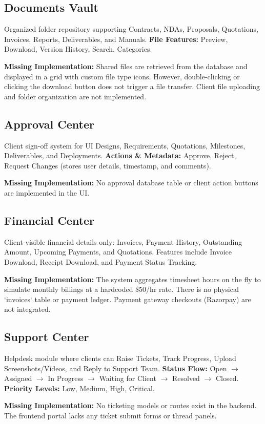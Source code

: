 \documentclass[11pt,a4paper]{article}
\begin{document}
\subsection{Documents Vault}
Organized folder repository supporting Contracts, NDAs, Proposals, Quotations, Invoices, Reports, Deliverables, and Manuals.
\newline
\textbf{File Features:} Preview, Download, Version History, Search, Categories.
\begin{partialstatus}
  \textbf{Missing Implementation:} Shared files are retrieved from the database and displayed in a grid with custom file type icons. However, double-clicking or clicking the download button does not trigger a file transfer. Client file uploading and folder organization are not implemented.
\end{partialstatus}

\subsection{Approval Center}
Client sign-off system for UI Designs, Requirements, Quotations, Milestones, Deliverables, and Deployments.
\newline
\textbf{Actions \& Metadata:} Approve, Reject, Request Changes (stores user details, timestamp, and comments).
\begin{missingstatus}
  \textbf{Missing Implementation:} No approval database table or client action buttons are implemented in the UI.
\end{missingstatus}

\subsection{Financial Center}
Client-visible financial details only: Invoices, Payment History, Outstanding Amount, Upcoming Payments, and Quotations. Features include Invoice Download, Receipt Download, and Payment Status Tracking.
\begin{partialstatus}
  \textbf{Missing Implementation:} The system aggregates timesheet hours on the fly to simulate monthly billings at a hardcoded \$50/hr rate. There is no physical `invoices` table or payment ledger. Payment gateway checkouts (Razorpay) are not integrated.
\end{partialstatus}

\subsection{Support Center}
Helpdesk module where clients can Raise Tickets, Track Progress, Upload Screenshots/Videos, and Reply to Support Team.
\newline
\textbf{Status Flow:} Open $\rightarrow$ Assigned $\rightarrow$ In Progress $\rightarrow$ Waiting for Client $\rightarrow$ Resolved $\rightarrow$ Closed.
\newline
\textbf{Priority Levels:} Low, Medium, High, Critical.
\begin{missingstatus}
  \textbf{Missing Implementation:} No ticketing models or routes exist in the backend. The frontend portal lacks any ticket submit forms or thread panels.
\end{missingstatus}
\end{document}
